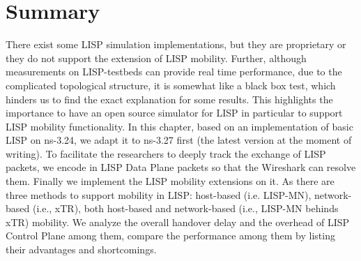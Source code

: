 \section{Summary}
\label{sec:ns3_conclusion}
There exist some LISP simulation implementations, but they are proprietary or they do not support the extension of LISP mobility. Further, although measurements on LISP-testbeds can provide real time performance, due to the complicated topological structure, it is somewhat like a black box test, which hinders us to find the exact explanation for some results. This highlights the importance to have an open source simulator for LISP in particular to support LISP mobility functionality. In this chapter, based on an implementation of basic LISP on ns-3.24, we adapt it to ns-3.27 first (the latest version at the moment of writing). To facilitate the researchers to deeply track the exchange of LISP packets, we encode in LISP Data Plane packets so that the Wireshark can resolve them. Finally we implement the LISP mobility extensions on it. As there are three methods to support mobility in LISP: host-based (i.e. LISP-MN), network-based (i.e., xTR), both host-based and network-based (i.e., LISP-MN behinds xTR) mobility. We analyze the overall handover delay and the overhead of LISP Control Plane among them, compare the performance among them by listing their advantages and shortcomings. %


